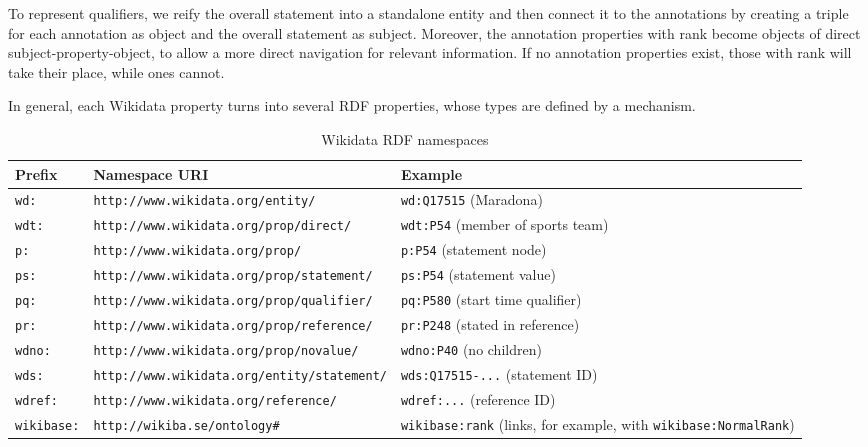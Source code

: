 To represent qualifiers, we reify the overall statement into a standalone entity and then connect it to the annotations by creating a triple for each annotation as object and the overall statement as subject.
Moreover, the annotation properties with  rank become objects of direct subject-property-object, to allow a more direct navigation for relevant information.
If no  annotation properties exist, those with  rank will take their place, while  ones cannot.

In general, each Wikidata property turns into several RDF properties, whose types are defined by a  mechanism.
\begin{table}[H]
    \centering
    \caption{Wikidata RDF namespaces}
    \label{tab:wikidata-namespaces}
    \begin{tabular}{@{}llp{5cm}@{}}
        \hline
        \textbf{Prefix} & \textbf{Namespace URI} & \textbf{Example} \\
        \hline
        \texttt{wd:} & \texttt{http://www.wikidata.org/entity/} & \texttt{wd:Q17515} (Maradona) \\
        \texttt{wdt:} & \texttt{http://www.wikidata.org/prop/direct/} & \texttt{wdt:P54} (member of sports team) \\
        \texttt{p:} & \texttt{http://www.wikidata.org/prop/} & \texttt{p:P54} (statement node) \\
        \texttt{ps:} & \texttt{http://www.wikidata.org/prop/statement/} & \texttt{ps:P54} (statement value) \\
        \texttt{pq:} & \texttt{http://www.wikidata.org/prop/qualifier/} & \texttt{pq:P580} (start time qualifier) \\
        \texttt{pr:} & \texttt{http://www.wikidata.org/prop/reference/} & \texttt{pr:P248} (stated in reference) \\
        \texttt{wdno:} & \texttt{http://www.wikidata.org/prop/novalue/} & \texttt{wdno:P40} (no children) \\
        \texttt{wds:} & \texttt{http://www.wikidata.org/entity/statement/} & \texttt{wds:Q17515-...} (statement ID) \\
        \texttt{wdref:} & \texttt{http://www.wikidata.org/reference/} & \texttt{wdref:...} (reference ID) \\
        \texttt{wikibase:} & \texttt{http://wikiba.se/ontology\#} & \texttt{wikibase:rank} (links, for example, with \texttt{wikibase:NormalRank}) \\
        \hline
    \end{tabular}
\end{table}

